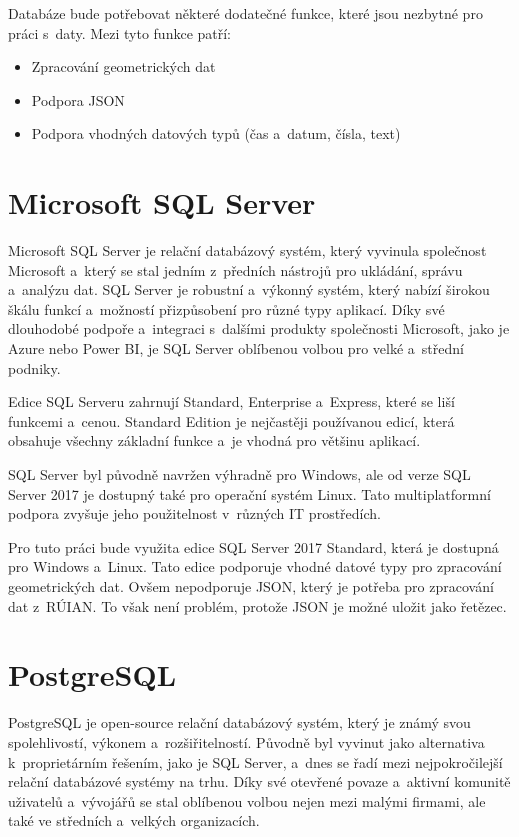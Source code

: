 Databáze bude potřebovat některé dodatečné funkce, které jsou nezbytné pro práci s~daty.
Mezi tyto funkce patří:
\begin{itemize}
    \item Zpracování geometrických dat
    \item Podpora JSON
    \item Podpora vhodných datových typů (čas a~datum, čísla, text)
\end{itemize}

\section{Microsoft SQL Server}
Microsoft SQL Server je relační databázový systém, který vyvinula společnost 
Microsoft a~který se stal jedním z~předních nástrojů pro ukládání, správu a~analýzu dat. 
SQL Server je robustní a~výkonný systém, který nabízí širokou škálu funkcí 
a~možností přizpůsobení pro různé typy aplikací. Díky své dlouhodobé podpoře a~integraci 
s~dalšími produkty společnosti Microsoft, jako je Azure nebo Power BI, je SQL Server 
oblíbenou volbou pro velké a~střední podniky.

Edice SQL Serveru zahrnují Standard, Enterprise a~Express, 
které se liší funkcemi a~cenou. Standard Edition je nejčastěji používanou edicí, 
která obsahuje všechny základní funkce a~je vhodná pro většinu aplikací.

SQL Server byl původně navržen výhradně pro Windows, ale od verze SQL Server 2017 je dostupný 
také pro operační systém Linux. Tato multiplatformní podpora zvyšuje jeho použitelnost 
v~různých IT prostředích.
\cite{microsoft_sql_server}

Pro tuto práci bude využita edice SQL Server 2017 Standard, která je dostupná pro Windows a~Linux.
Tato edice podporuje vhodné datové typy pro zpracování geometrických dat.
Ovšem nepodporuje JSON, který je potřeba pro zpracování dat z~RÚIAN.
To však není problém, protože JSON je možné uložit jako řetězec.

\section{PostgreSQL}
PostgreSQL je open-source relační databázový systém, který je známý svou spolehlivostí, výkonem 
a~rozšiřitelností. Původně byl vyvinut jako alternativa k~proprietárním řešením, jako je SQL Server, 
a~dnes se řadí mezi nejpokročilejší relační databázové systémy na trhu. Díky své otevřené povaze 
a~aktivní komunitě uživatelů a~vývojářů se stal oblíbenou volbou nejen mezi malými firmami, 
ale také ve středních a~velkých organizacích.

